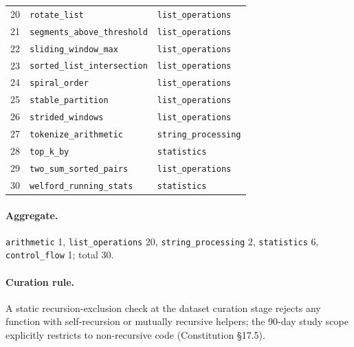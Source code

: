 \begin{table}[h]
\begin{tabular}{rll}
20 & \texttt{rotate\_list}             & \texttt{list\_operations} \\
21 & \texttt{segments\_above\_threshold} & \texttt{list\_operations} \\
22 & \texttt{sliding\_window\_max}     & \texttt{list\_operations} \\
23 & \texttt{sorted\_list\_intersection} & \texttt{list\_operations} \\
24 & \texttt{spiral\_order}            & \texttt{list\_operations} \\
25 & \texttt{stable\_partition}        & \texttt{list\_operations} \\
26 & \texttt{strided\_windows}         & \texttt{list\_operations} \\
27 & \texttt{tokenize\_arithmetic}     & \texttt{string\_processing} \\
28 & \texttt{top\_k\_by}               & \texttt{statistics} \\
29 & \texttt{two\_sum\_sorted\_pairs}  & \texttt{list\_operations} \\
30 & \texttt{welford\_running\_stats}  & \texttt{statistics} \\
\bottomrule
\end{tabular}
\end{table}

\paragraph{Aggregate.}
\texttt{arithmetic} 1,
\texttt{list\_operations} 20,
\texttt{string\_processing} 2,
\texttt{statistics} 6,
\texttt{control\_flow} 1; total 30.

\paragraph{Curation rule.}
A static recursion-exclusion check at the dataset curation stage rejects any
function with self-recursion or mutually recursive helpers; the 90-day study
scope explicitly restricts to non-recursive code (Constitution \S17.5).
